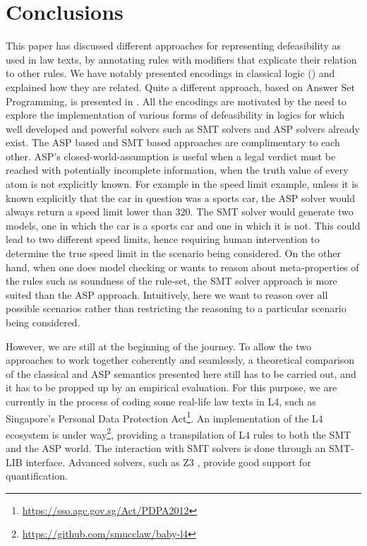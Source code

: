 \section{Conclusions}\label{sec:conclusions}

This paper has discussed different approaches for representing defeasibility
as used in law texts, by annotating rules with modifiers that explicate their
relation to other rules. We have notably presented encodings in classical
logic () and explained
how they are related. Quite a different approach,
based on Answer Set Programming, is presented in
. All the encodings are motivated by the need to
explore the implementation of various forms of defeasibility in logics for
which well developed and powerful solvers such as SMT solvers and ASP solvers
already exist. The ASP based and SMT based approaches are complimentary to
each other. ASP's closed-world-assumption is useful when a legal verdict must
be reached with potentially incomplete information, when the truth value of
every atom is not explicitly known. For example in the speed limit example,
unless it is known explicitly that the car in question was a sports car, the
ASP solver would always return a speed limit lower than $320$. The SMT solver
would generate two models, one in which the car is a sports car and one in
which it is not. This could lead to two different speed limits, hence
requiring human intervention to determine the true speed limit in the scenario
being considered. On the other hand, when one does model checking or wants to
reason about meta-properties of the rules such as soundness of the rule-set,
the SMT solver approach is more suited than the ASP approach. Intuitively,
here we want to reason over all possible scenarios rather than restricting the
reasoning to a particular scenario being considered.

However, we are still at the beginning of the journey. To allow the two
approaches to work together coherently and seamlessly, a theoretical
comparison of the classical and ASP semantics presented here still has to be
carried out, and it has to be propped up by an empirical evaluation. For this
purpose, we are currently in the process of coding some real-life law texts in
L4, such as Singapore's Personal Data Protection
Act\footnote{\url{https://sso.agc.gov.sg/Act/PDPA2012}}.  An implementation of
the L4 ecosystem is under
way\footnote{\url{https://github.com/smucclaw/baby-l4}}, providing a
transpilation of L4 rules to both the SMT and the ASP world. The interaction
with SMT solvers is done through an SMT-LIB \citep{BarFT_SMTLIB}
interface. Advanced solvers, such as Z3 \citep{demoura_bjorner_z3_2008},
provide good support for quantification.

